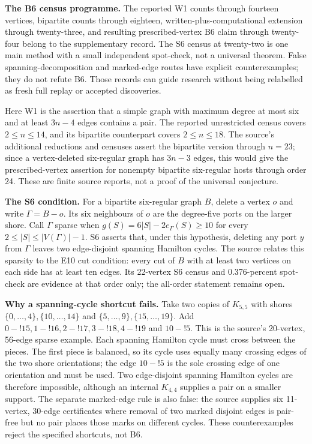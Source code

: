 \documentclass[
  11pt,
]{article}
\newcounter{none} %
\begin{document}
\textbf{The B6 census programme.} The reported W1 counts through
fourteen vertices, bipartite counts through eighteen,
written-plus-computational extension through twenty-three, and resulting
prescribed-vertex B6 claim through twenty-four belong to the
supplementary record. The S6 census at twenty-two is one main method
with a small independent spot-check, not a universal theorem. False
spanning-decomposition and marked-edge routes have explicit
counterexamples; they do not refute B6. Those records can guide research
without being relabelled as fresh full replay or accepted discoveries.

Here W1 is the assertion that a simple graph with maximum degree at most
six and at least \(3n-4\) edges contains a pair. The reported
unrestricted census covers \(2\le n\le14\), and its bipartite
counterpart covers \(2\le n\le18\). The source's additional reductions
and censuses assert the bipartite version through \(n=23\); since a
vertex-deleted six-regular graph has \(3n-3\) edges, this would give the
prescribed-vertex assertion for nonempty bipartite six-regular hosts
through order 24. These are finite source reports, not a proof of the
universal conjecture.

\textbf{The S6 condition.} For a bipartite six-regular graph \(B\),
delete a vertex \(o\) and write \(\Gamma=B-o\). Its six neighbours of
\(o\) are the degree-five ports on the larger shore. Call \(\Gamma\)
sparse when \(g(S)=6|S|-2e_\Gamma(S)\ge10\) for every
\(2\le|S|\le|V(\Gamma)|-1\). S6 asserts that, under this hypothesis,
deleting any port \(y\) from \(\Gamma\) leaves two edge-disjoint
spanning Hamilton cycles. The source relates this sparsity to the E10
cut condition: every cut of \(B\) with at least two vertices on each
side has at least ten edges. Its 22-vertex S6 census and 0.376-percent
spot-check are evidence at that order only; the all-order statement
remains open.

\textbf{Why a spanning-cycle shortcut fails.} Take two copies of
\(K_{5,5}\) with shores \(\{0,\ldots,4\},\{10,\ldots,14\}\) and
\(\{5,\ldots,9\},\{15,\ldots,19\}\). Add
\(0\!-!15,1\!-!16,2\!-!17,3\!-!18,4\!-!19\) and \(10\!-!5\). This is the
source's 20-vertex, 56-edge sparse example. Each spanning Hamilton cycle
must cross between the pieces. The first piece is balanced, so its cycle
uses equally many crossing edges of the two shore orientations; the edge
\(10\!-!5\) is the sole crossing edge of one orientation and must be
used. Two edge-disjoint spanning Hamilton cycles are therefore
impossible, although an internal \(K_{4,4}\) supplies a pair on a
smaller support. The separate marked-edge rule is also false: the source
supplies six 11-vertex, 30-edge certificates where removal of two marked
disjoint edges is pair-free but no pair places those marks on different
cycles. These counterexamples reject the specified shortcuts, not B6.
\end{document}
